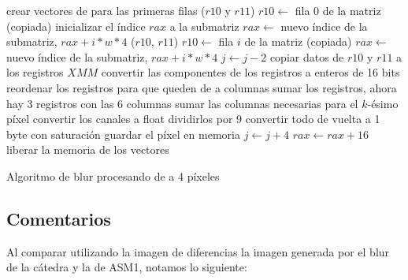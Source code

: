 \begin{algorithm}[H]
\DontPrintSemicolon
{}

 \BlankLine
 crear vectores de para las primeras filas ($r10$ y $r11$)\;
 $r10 \gets$ fila $0$ de la matriz (copiada)\;
 inicializar el índice $rax$ a la submatriz\;
 \BlankLine
  {
    $rax \gets$ nuevo índice de la submatriz, $rax + i*w*4$\;
    \Swap($r10$, $r11$)\;
    $r10 \gets$ fila $i$ de la matriz (copiada)\;
    $rax \gets$ nuevo índice de la submatriz, $rax + i*w*4$\;
    \BlankLine
     {
         {
            $j \gets j - 2$\;
        }
        \BlankLine
        copiar datos de $r10$ y $r11$ a los registros $XMM$\;
        convertir las componentes de los registros a enteros de 16 bits\;
        reordenar los registros para que queden de a columnas\;
        sumar los registros, ahora hay 3 registros con las 6 columnas\;
        \BlankLine
         {
            sumar las columnas necesarias para el $k$-ésimo píxel\;
            convertir los canales a float\;
            dividirlos por 9\;
            convertir todo de vuelta a 1 byte con saturación\;
            guardar el píxel en memoria\;
        }
        \BlankLine
        $j \gets j + 4$\;
        $rax \gets rax + 16$\;
    }
 }
 \BlankLine
 liberar la memoria de los vectores
 \BlankLine
 \caption{Algoritmo de blur procesando de a 4 píxeles}
\end{algorithm}

\pagebreak


\subsection{Comentarios}
Al comparar utilizando la imagen de diferencias la imagen generada por el blur de la cátedra y la de ASM1, notamos lo siguiente:

